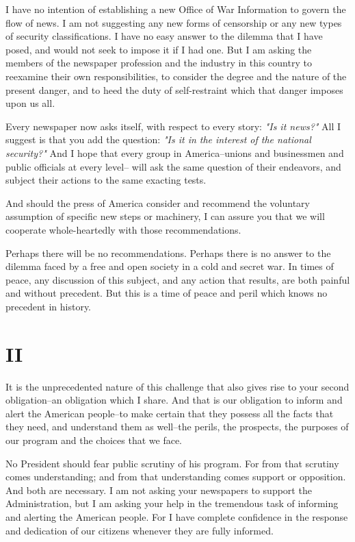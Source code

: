\documentclass{article}
\begin{document}
I have no intention of establishing a new Office of War Information to govern the flow of news. I am not suggesting any new forms of censorship or any new types of security classifications. I have no easy answer to the dilemma that I have posed, and would not seek to impose it if I had one. But I am asking the members of the newspaper profession and the industry in this country to reexamine their own responsibilities, to consider the degree and the nature of the present danger, and to heed the duty of self-restraint which that danger imposes upon us all.

Every newspaper now asks itself, with respect to every story: \emph{"Is it news?"} All I suggest is that you add the question: \emph{"Is it in the interest of the national security?"} And I hope that every group in America--unions and businessmen and public officials at every level-- will ask the same question of their endeavors, and subject their actions to the same exacting tests.

And should the press of America consider and recommend the voluntary assumption of specific new steps or machinery, I can assure you that we will cooperate whole-heartedly with those recommendations.

Perhaps there will be no recommendations. Perhaps there is no answer to the dilemma faced by a free and open society in a cold and secret war. In times of peace, any discussion of this subject, and any action that results, are both painful and without precedent. But this is a time of peace and peril which knows no precedent in history.

\section*{II}

It is the unprecedented nature of this challenge that also gives rise to your second obligation--an obligation which I share. And that is our obligation to inform and alert the American people--to make certain that they possess all the facts that they need, and understand them as well--the perils, the prospects, the purposes of our program and the choices that we face.

No President should fear public scrutiny of his program. For from that scrutiny comes understanding; and from that understanding comes support or opposition. And both are necessary. I am not asking your newspapers to support the Administration, but I am asking your help in the tremendous task of informing and alerting the American people. For I have complete confidence in the response and dedication of our citizens whenever they are fully informed.
\end{document}
